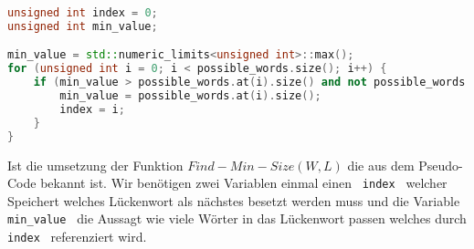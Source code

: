 \documentclass{article}
\begin{document}
\lstset{language=C++}
\begin{lstlisting}[language=C++]
unsigned int index = 0;
unsigned int min_value;

min_value = std::numeric_limits<unsigned int>::max();
for (unsigned int i = 0; i < possible_words.size(); i++) {
	if (min_value > possible_words.at(i).size() and not possible_words.at(i).empty()) {
		min_value = possible_words.at(i).size();
		index = i;
	}
}
\end{lstlisting}
Ist die umsetzung der Funktion $Find-Min-Size(W, L)$ die aus dem Pseudo-Code bekannt ist. Wir benötigen zwei Variablen einmal einen \verb| index | welcher Speichert welches Lückenwort als nächstes besetzt werden muss und die Variable \verb| min_value | die Aussagt wie viele Wörter in das Lückenwort passen welches durch \verb| index | referenziert wird.
\end{document}
